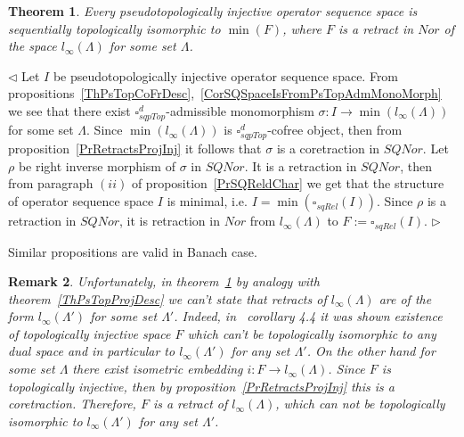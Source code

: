 \documentclass[12pt]{article}
\newtheorem{theorem}{Theorem}[subsection]
\newtheorem{remark}[theorem]{Remark}
\newenvironment{proof}{\par $\triangleleft$}{$\triangleright$}
\begin{document}
\begin{theorem}\label{ThPsTopInjDesc} 
Every pseudotopologically injective operator sequence space is sequentially 
topologically isomorphic to $\min(F)$, where $F$ is a retract in $Nor$ of 
the space $l_\infty(\Lambda)$ for some set $\Lambda$.
\end{theorem}
\begin{proof}
Let $I$ be pseudotopologically injective operator sequence space. 
From propositions~\ref{ThPsTopCoFrDesc},~\ref{CorSQSpaceIsFromPsTopAdmMonoMorph} 
we see that there exist $\square_{sqpTop}^d$-admissible 
monomorphism $\sigma:I\to\min(l_\infty(\Lambda))$ for some set $\Lambda$. 
Since $\min(l_\infty(\Lambda))$ is $\square_{sqpTop}^d$-cofree object, then 
from proposition~\ref{PrRetractsProjInj} it follows that $\sigma$ is a 
coretraction in $SQNor$. Let $\rho$ be right inverse morphism of $\sigma$ 
in $SQNor$. It is a retraction in $SQNor$, then from paragraph $(ii)$ of 
proposition~\ref{PrSQReldChar} we get that the structure of operator sequence 
space $I$ is minimal, i.e. $I=\min(\square_{sqRel}(I))$. Since $\rho$ is a 
retraction in $SQNor$, it is retraction in $Nor$ from $l_\infty(\Lambda)$ 
to $F:=\square_{sqRel}(I)$.
\end{proof}

Similar propositions are valid in Banach case.

\begin{remark} Unfortunately, in theorem~\ref{ThPsTopInjDesc} by analogy with 
theorem~\ref{ThPsTopProjDesc} we can't state that retracts 
of $l_\infty(\Lambda)$ are of the form $l_\infty(\Lambda')$ for some 
set $\Lambda'$. Indeed, in~\cite{RosInjLmuSp} corollary 4.4 it was shown 
existence of topologically injective space $F$ which can't be topologically 
isomorphic to any dual space and in particular to $l_\infty(\Lambda')$ for 
any set $\Lambda'$. On the other hand for some set $\Lambda$ there exist 
isometric embedding $i:F\to l_\infty(\Lambda)$. Since $F$ is topologically 
injective, then by proposition~\ref{PrRetractsProjInj} this is a coretraction. 
Therefore, $F$ is a retract of $l_\infty(\Lambda)$, which can not be 
topologically isomorphic to $l_\infty(\Lambda')$ for any set $\Lambda'$.
\end{remark}
\end{document}
